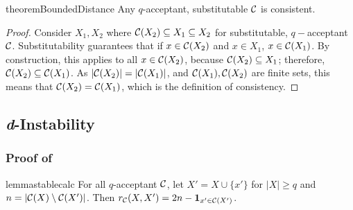\begin{restatable}{theorem}{BoundedDistance}
\label{thm:sub-accept-consistent}
Any $q$-acceptant, substitutable $\mathcal{C}$ is consistent.
\end{restatable}

\begin{proof}
Consider $X_1, X_2$ where $\mathcal{C}(X_2) \subseteq X_1 \subseteq X_2$ for substitutable, $q-$acceptant $\mathcal{C}$. Substitutability guarantees that if $x \in \mathcal{C}(X_2)$ and $x \in X_1$, $x \in \mathcal{C}(X_1)$. By construction, this applies to all $x \in \mathcal{C}(X_2)$, because $\mathcal{C}(X_2) \subseteq X_1$; therefore, $\mathcal{C}(X_2) \subseteq \mathcal{C}(X_1)$. As $|\mathcal{C}(X_2)| = |\mathcal{C}(X_1)|$, and $\mathcal{C}(X_1),\mathcal{C}(X_2)$ are finite sets, this means that $\mathcal{C}(X_2) = \mathcal{C}(X_1)$, which is the definition of consistency.
\end{proof}

\subsection{\textit{d}-Instability} \label{sec:d-unstable-appendix}

\subsubsection{Proof of } \label{sec:calc-proof}

\begin{restatable}{lemma}{stablecalc}
\label{lem:unstable-calc}
For all $q$-acceptant $\mathcal{C}$, let $X' = X \cup \{x'\}$ for $|X| \geq q$ and $n = |\mathcal{C}(X) \setminus \mathcal{C}(X')|$.  Then
$r_{\mathcal{C}}(X, X') = 2n-\mathbf{1}_{x'\in\mathcal{C}(X')}$.
\end{restatable}

